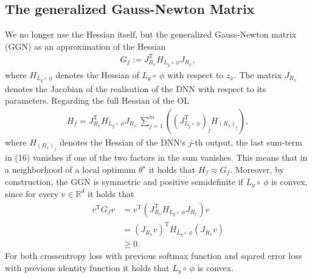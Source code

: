 \documentclass[conference]{IEEEtran}
\begin{document}
	\subsection{The generalized Gauss-Newton Matrix}
	\noindent
	We no longer use the Hessian itself, but the generalized Gauss-Newton matrix (GGN) as an approximation of the Hessian
	\begin{align}
	G_{f} := J_{R_{x}}^{\mathrm{T}}H_{L_{y}\circ\:\phi}J_{R_{x}},
	\end{align}
	where $H_{L_{y}\circ\:\phi}$ denotes the Hessian of $L_{y}\circ\:\phi$ with respect to $z_{x}$. The matrix $J_{R_{x}}$ denotes the Jacobian of the realisation of the DNN with respect to its parameters.
	Regarding the full Hessian of the OL
	\begin{align}
	H_{f} = J_{R_{x}}^{\mathrm{T}}H_{L_{y}\circ\:\phi}J_{R_{x}}\:\sum_{j = 1}^{m}\left(\left(J_{L_{y}\circ \:\phi}^{\mathrm{T}}\right)_{j} H_{(R_{x})_{j}}\right),
	\end{align}
	where $H_{(R_{x})_{j}}$ denotes the Hessian of the DNN`s  $j$-th output, the last sum-term in (16) vanishes if one of the two factors in the sum vanishes.
	This means that in a neighborhood of a local optimum $\theta^{\star}$ it holds that $H_{f} \approx G_{f}$.   Moreover, by construction, the GGN is symmetric and positive semidefinite if $L_{y}\circ\:\phi$ is convex, since for every $v\in\mathbb{R}^{d}$ it holds that
	\begin{align}
	v^{\mathrm{T}}G_{f}v &= v^{\mathrm{T}}\left( J_{R_{x}}^{\mathrm{T}}H_{L_{y}\circ\:\phi}J_{R_{x}}\right)v\\
	&= \left(J_{R_{x}}v\right)^{\mathrm{T}}H_{L_{y}\circ\:\phi}\left(J_{R_{x}}v\right) \\
	&\geq 0.
	\end{align}
	For both crossentropy loss with previous softmax function and sqared error loss with previous identity function it holds that $L_{y}\circ\:\phi$ is convex.
	
\end{document}
